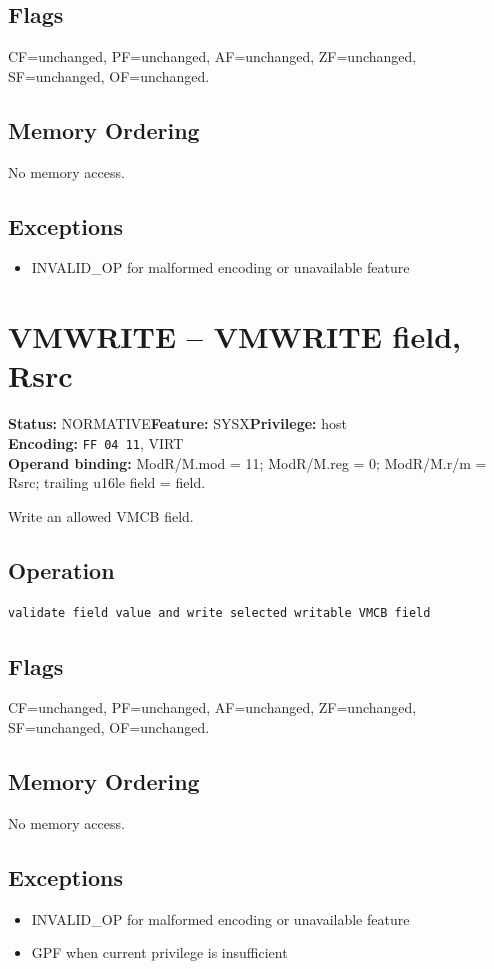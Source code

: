 \documentclass[10pt]{article}
\begin{document}
\subsection*{Flags}
CF=unchanged, PF=unchanged, AF=unchanged, ZF=unchanged, SF=unchanged, OF=unchanged.
\subsection*{Memory Ordering}
No memory access.
\subsection*{Exceptions}
\begin{itemize}
\item INVALID\_OP for malformed encoding or unavailable feature
\end{itemize}
\clearpage

\section{VMWRITE -- VMWRITE field, Rsrc}
\textbf{Status:} NORMATIVE\quad \textbf{Feature:} SYSX\quad \textbf{Privilege:} host\\
\textbf{Encoding:} \texttt{FF 04 11}, VIRT\\
\textbf{Operand binding:} ModR/M.mod = 11; ModR/M.reg = 0; ModR/M.r/m = Rsrc; trailing u16le field = field.

Write an allowed VMCB field.

\subsection*{Operation}
\begin{lstlisting}
validate field value and write selected writable VMCB field
\end{lstlisting}
\subsection*{Flags}
CF=unchanged, PF=unchanged, AF=unchanged, ZF=unchanged, SF=unchanged, OF=unchanged.
\subsection*{Memory Ordering}
No memory access.
\subsection*{Exceptions}
\begin{itemize}
\item INVALID\_OP for malformed encoding or unavailable feature
\item GPF when current privilege is insufficient
\end{itemize}
\clearpage
\end{document}
